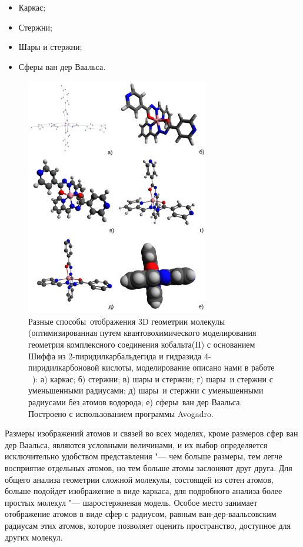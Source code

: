 \documentclass[10pt, a5paper]{article}
\begin{document}
\begin{itemize}
  \item Каркас;
  \item Стержни;
  \item Шары и стержни;
  \item Сферы ван дер Ваальса.
\end{itemize}

\begin{figure}[h!]
  \centering
  \includegraphics[width=8cm]{20_2016_Litvenenka3.png}
  \caption{Разные способы отображения 3D геометрии молекулы (оптимизированная путем квантовохимического моделирования геометрия комплексного соединения кобальта(II) с основанием Шиффа из 2-пиридилкарбальдегида и гидразида 4-пиридилкарбоновой кислоты, моделирование описано нами в работе ~\cite{Litvenenka2}): а) каркас; б) стержни; в) шары и стержни; г) шары и стержни с уменьшенными радиусами; д) шары и стержни с уменьшенными радиусами без атомов водорода; е) сферы ван дер Ваальса. Построено с использованием программы Avogadro.}
  \label{Litvenenka3}
\end{figure} 

Размеры изображений атомов и связей во всех моделях, кроме размеров сфер ван дер Ваальса, являются условными величинами, и их выбор определяется исключительно удобством представления "--- чем больше размеры, тем легче восприятие отдельных атомов, но тем больше атомы заслоняют друг друга. Для общего анализа геометрии сложной молекулы, состоящей из сотен атомов, больше подойдет изображение в виде каркаса, для подробного анализа более простых молекул "--- шаростержневая модель. Особое место занимает отображение атомов в виде сфер с радиусом, равным ван-дер-ваальсовским радиусам этих атомов, которое позволяет оценить пространство, доступное для других молекул.
\end{document}
